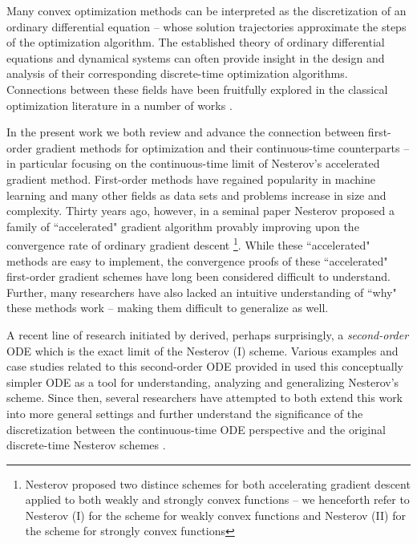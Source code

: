Many convex optimization methods can be interpreted as the discretization of an ordinary differential equation -- whose solution trajectories approximate the steps of the optimization algorithm. The established theory of ordinary differential equations and dynamical systems can often provide insight in the design and analysis of their corresponding discrete-time optimization algorithms. Connections between these fields have been fruitfully explored in the classical optimization literature in a number of works \cite{helmke2012optimization, schropp2000dynamical, fiori2005quasi, durr2012class, dorr2012smooth, osher2016sparse, qin2012structured, lessard2016analysis}.

In the present work we both review and advance the connection between first-order gradient methods for optimization and their continuous-time counterparts -- in particular focusing on the continuous-time limit of Nesterov's accelerated gradient method. First-order methods have regained popularity in machine learning and many other fields as data sets and problems increase in size and complexity. Thirty years ago, however, in a seminal paper Nesterov proposed a family of ``accelerated" gradient algorithm provably improving upon the convergence rate of ordinary gradient descent \cite{nesterov1983method} \footnote{Nesterov proposed two distince schemes for both accelerating gradient descent applied to both weakly and strongly convex functions -- we henceforth refer to Nesterov (I) for the scheme for weakly convex functions and Nesterov (II) for the scheme for strongly convex functions}. While these ``accelerated" methods are easy to implement, the convergence proofs of these ``accelerated" first-order gradient schemes have long been considered difficult to understand. Further, many researchers have also lacked an intuitive understanding of ``why" these methods work -- making them difficult to generalize as well.

A recent line of research initiated by \cite{su2014differential} derived, perhaps surprisingly, a \textit{second-order} ODE which is the exact limit of the  Nesterov (I) scheme. Various examples and case studies related to this second-order ODE provided in \cite{su2014differential} used this conceptually simpler ODE as a tool for understanding, analyzing and generalizing Nesterov’s scheme. Since then, several researchers have attempted to both extend this work into more general settings and further understand the significance of the discretization between the continuous-time ODE perspective and the original discrete-time Nesterov schemes \cite{krichene2015accelerated, wibisono2016variational, wilson2016lyapunov}.

